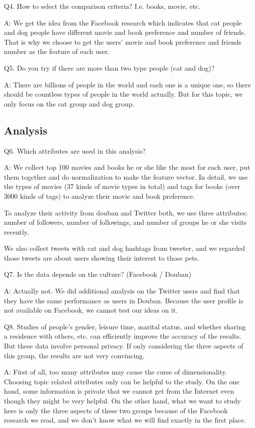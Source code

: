 \documentclass[12pt]{article}
\begin{document}
Q4. How to select the comparison criteria? I.e. books, movie, etc.

A: We get the idea from the Facebook research which indicates that cat people and dog people have different movie and book preference and number of friends. That is why we choose to get the users' movie and book preference and friends number as the feature of each user.

Q5. Do you try if there are more than two type people (cat and dog)?

A: There are billions of people in the world and each one is a unique one, so there should be countless types of people in the world actually. But for this topic, we only focus on the cat group and dog group.

\subsection{Analysis}
Q6. Which attributes are used in this analysis?

A: We collect top 100 movies and books he or she like the most for each user, put them together and do normalization to make the feature vector. In detail, we use the types of movies (37 kinds of movie types in total) and tags for books (over 3000 kinds of tags) to analyze their movie and book preference.

To analyze their activity from douban and Twitter both, we use three attributes: number of followers, number of followings, and number of groups he or she visits recently.

We also collect tweets with cat and dog hashtags from tweeter, and we regarded those tweets are about users showing their interest to those pets.

Q7. Is the data depends on the culture? (Facebook / Douban)

A: Actually not. We did additional analysis on the Twitter users and find that they have the same performance as users in Douban. Because the user profile is not available on Facebook, we cannot test our ideas on it.

Q8. Studies of people's gender, leisure time, marital status, and whether sharing a residence with others, etc. can efficiently improve the accuracy of the results. But these data involve personal privacy. If only considering the three aspects of this group, the results are not very convincing.

A: First of all, too many attributes may cause the curse of dimensionality. Choosing topic related attributes only can be helpful to the study. On the one hand, some information is private that we cannot get from the Internet even though they might be very helpful. On the other hand, what we want to study here is only the three aspects of these two groups because of the Facebook research we read, and we don't know what we will find exactly in the first place.
\end{document}
